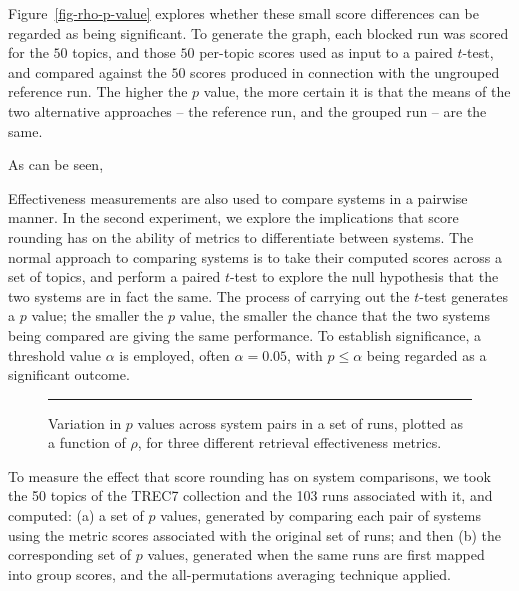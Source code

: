 Figure~\ref{fig-rho-p-value} explores whether these small score
differences can be regarded as being significant.
To generate the graph, each blocked run was scored for the $50$
topics, and those $50$ per-topic scores used as input to a paired
$t$-test, and compared against the $50$ scores produced in connection
with the ungrouped reference run.
The higher the $p$ value, the more certain it is that the means of
the two alternative approaches -- the reference run, and the grouped
run -- are the same.

As can be seen, {}

{}


Effectiveness measurements are also used to compare systems in a
pairwise manner.
In the second experiment, we explore the implications that score
rounding has on the ability of metrics to differentiate between
systems.
The normal approach to comparing systems is to take their computed
scores across a set of topics, and perform a paired $t$-test to
explore the null hypothesis that the two systems are in fact the
same.
The process of carrying out the $t$-test generates a $p$ value; the
smaller the $p$ value, the smaller the chance that the two systems
being compared are giving the same performance.
To establish significance, a threshold value $\alpha$ is employed,
often $\alpha=0.05$, with $p\le\alpha$ being regarded as a
significant outcome.

\begin{figure}[t]
\centering
\rule{0.5mm}{45mm}
\caption{Variation in $p$ values across system pairs in a set
of runs, plotted as a function of $\rho$, for three different
retrieval effectiveness metrics.
{}
{}
{}
{}
\label{fig-pair-variation}}
\end{figure}

To measure the effect that score rounding has on system comparisons,
we took the 50 topics of the TREC7 {} collection
and the 103 runs associated with it, and computed: (a) a set
of $p$ values, generated by comparing each pair of systems using the
metric scores associated with the original set of runs; and then (b)
the corresponding set of $p$ values, generated when the same runs are
first mapped into group scores, and the all-permutations averaging
technique applied.
